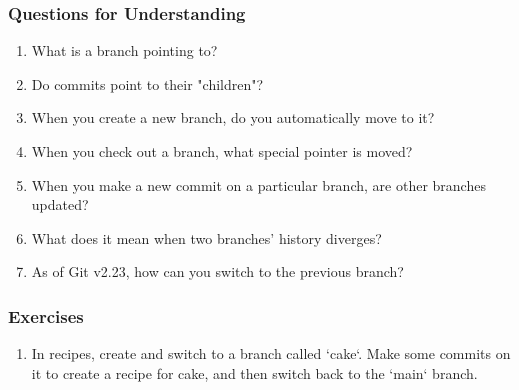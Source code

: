 \subsubsection{Questions for Understanding}
\begin{enumerate}
	\item What is a branch pointing to?
	\item Do commits point to their "children"?
	\item When you create a new branch, do you automatically move to it?
	\item When you check out a branch, what special pointer is moved?
	\item When you make a new commit on a particular branch, are other branches 
	   updated?
	\item What does it mean when two branches' history diverges?
	\item As of Git v2.23, how can you switch to the previous branch?
\end{enumerate}

\subsubsection{Exercises}
\begin{enumerate}
\item In recipes, create and switch to a branch called `cake`.
   Make some commits on it to create a recipe for cake, and then switch back
   to the `main` branch.
\end{enumerate}
